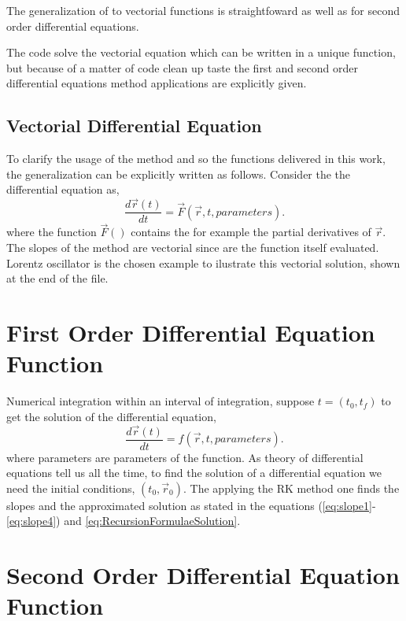\documentclass[12pt]{article}
\begin{document}
The generalization of to vectorial functions is straightfoward as well
as for second order differential equations.

The code solve the vectorial equation which can be written in a unique
function, but because of a matter of code clean up taste the first and
second order differential equations method applications are explicitly
given.

\subsection{Vectorial Differential Equation}
\label{sec:VectorialDE}

To clarify the usage of the method and so the functions
delivered in this work, the generalization can be explicitly
written as follows. Consider the the differential equation as,
\begin{equation}
  \label{eq:DiffEq}
  \frac{d\vec{r}(t)}{dt} = \vec{F}(\vec{r},t,parameters).
\end{equation}
where the function \(\vec{F}()\) contains the for example the partial
derivatives of \(\vec{r}\). The slopes of the method are vectorial
since are the function itself evaluated. Lorentz oscillator is the
chosen example to ilustrate this vectorial solution, shown at the end
of the file.

\section{First Order Differential Equation Function}
\label{sec:FODE}

Numerical integration within an interval of integration, suppose
\(t=(t_{0},t_{f})\) to get the solution of the differential equation,
\begin{equation}
  \label{eq:DiffEq}
  \frac{d\vec{r}(t)}{dt}=f(\vec{r},t,parameters).
\end{equation}
where parameters are parameters of the function. As theory of
differential equations tell us all the time, to find the solution of a
differential equation we need the initial conditions,
\((t_{0},\vec{r}_{0})\). The applying the RK method one finds the
slopes and the approximated solution as stated in the equations
(\eqref{eq:slope1}-\eqref{eq:slope4}) and
\eqref{eq:RecursionFormulaeSolution}.

\section{Second Order Differential Equation Function}
\label{sec:SecondODEFunction}
\end{document}
